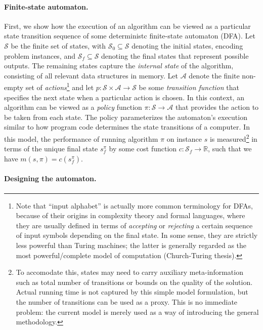 \documentclass[a4paper]{report}
\theoremstyle{definition}
\theoremstyle{plain}
\begin{document}
\paragraph{Finite-state automaton.}
First, we show how the execution of an algorithm can be viewed as a particular
state transition sequence of some deterministc finite-state automaton (DFA). Let
$\mathcal{S}$ be the finite set of states, with
$\mathcal{S}_0 \subseteq \mathcal{S}$ denoting the initial states, encoding
problem instances, and $\mathcal{S}_f \subseteq \mathcal{S}$ denoting the final
states that represent possible outputs. The remaining states capture the
\emph{internal state} of the algorithm, consisting of all relevant data
structures in memory.
%
Let $\mathcal{A}$ denote the finite non-empty set of \emph{actions}\footnote{Note that
  ``input alphabet'' is actually more common terminology for DFAs, because of
  their origins in complexity theory and formal languages, where they are
  usually defined in terms of \emph{accepting} or \emph{rejecting} a certain sequence of input
  symbols depending on the final state. In some sense, they are strictly less
  powerful than Turing machines; the latter is generally regarded as the most
  powerful/complete model of computation (Church-Turing thesis).}
%
and let $p : \mathcal{S} \times \mathcal{A} \to \mathcal{S}$ be some
\emph{transition function} that specifies the next state when a particular
action is chosen.
%
In this context, an algorithm can be viewed as a \emph{policy} function
$\pi : \mathcal{S} \rightarrow \mathcal{A}$ that provides the action to be taken
from each state.
%
The policy parameterizes the automaton’s execution similar to how program code
determines the state transitions of a computer.
%
In this model, the performance of running algorithm $\pi$ on instance $s$ is
measured\footnote{To accomodate this, states may need to carry auxiliary
  meta-information such as total number of transitions or bounds on the quality
  of the solution. Actual running time is not captured by this simple model
  formulation, but the number of transitions can be used as a proxy. This is no
  immediate problem: the current model is merely used as a way of introducing
  the general methodology.} in terms of the unique final state $s_f^\pi$ by some
cost function $c : \mathcal{S}_f \rightarrow \mathbb{R}$, such that we have
$m(s,\pi) = c(s_f^\pi)$.

\paragraph{Designing the automaton.}
\end{document}
